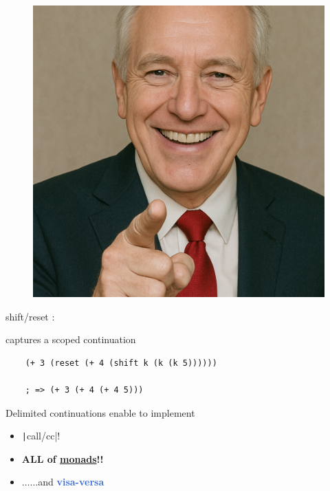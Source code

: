 \begin{frame}[fragile]
\begin{minipage}[t]{.60\textwidth}
	\end{minipage}
	\begin{minipage}[t]{.30\textwidth}
		\begin{figure}[h]
			\includegraphics[width=\textwidth]{img/pointing-smile-man.png}
		\end{figure}
	\end{minipage}
\end{frame}

\begin{frame}[fragile]
	\frametitlesubs

	shift/reset \cite{danvy1990abstracting}:

	captures a scoped continuation

	\begin{verbatim}
    (+ 3 (reset (+ 4 (shift k (k (k 5))))))

    ; => (+ 3 (+ 4 (+ 4 5)))
  \end{verbatim}

	\pause
	Delimited continuations enable to implement

	\begin{itemize}
		\item[\emoji{check-mark-button}] \texttt|call/cc|!
		\item[\emoji{check-mark-button}] \textcolor{subhighlight}{\bf ALL of \underline{monads}!!}

		      \pause\LARGE
		\item[] $\dots\dots$and \textcolor{highlight}{\bf visa-versa}\cite{dybvig2005a}
	\end{itemize}
\end{frame}

